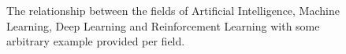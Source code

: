 \begin{figure}[htp!]
    \centering
    
    \captionsetup{format=hang} %
    \caption{
        The relationship between the fields of Artificial Intelligence,
        Machine Learning, Deep Learning and Reinforcement Learning with some
        arbitrary example provided per field.
    }
    \label{fig:al-ml-dl}
\end{figure}



\newpage

\newpage
